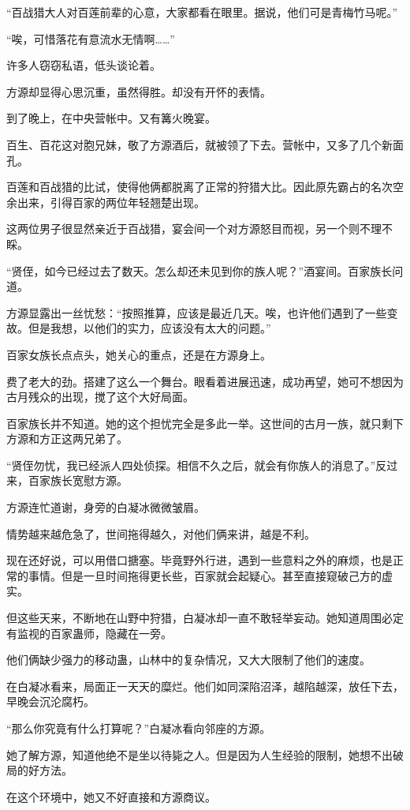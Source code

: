 \begin{this_body}
“百战猎大人对百莲前辈的心意，大家都看在眼里。据说，他们可是青梅竹马呢。”

“唉，可惜落花有意流水无情啊……”

许多人窃窃私语，低头谈论着。

方源却显得心思沉重，虽然得胜。却没有开怀的表情。

到了晚上，在中央营帐中。又有篝火晚宴。

百生、百花这对胞兄妹，敬了方源酒后，就被领了下去。营帐中，又多了几个新面孔。

百莲和百战猎的比试，使得他俩都脱离了正常的狩猎大比。因此原先霸占的名次空余出来，引得百家的两位年轻翘楚出现。

这两位男子很显然亲近于百战猎，宴会间一个对方源怒目而视，另一个则不理不睬。

“贤侄，如今已经过去了数天。怎么却还未见到你的族人呢？”酒宴间。百家族长问道。

方源显露出一丝忧愁：“按照推算，应该是最近几天。唉，也许他们遇到了一些变故。但是我想，以他们的实力，应该没有太大的问题。”

百家女族长点点头，她关心的重点，还是在方源身上。

费了老大的劲。搭建了这么一个舞台。眼看着进展迅速，成功再望，她可不想因为古月残众的出现，搅了这个大好局面。

百家族长并不知道。她的这个担忧完全是多此一举。这世间的古月一族，就只剩下方源和方正这两兄弟了。

“贤侄勿忧，我已经派人四处侦探。相信不久之后，就会有你族人的消息了。”反过来，百家族长宽慰方源。

方源连忙道谢，身旁的白凝冰微微皱眉。

情势越来越危急了，世间拖得越久，对他们俩来讲，越是不利。

现在还好说，可以用借口搪塞。毕竟野外行进，遇到一些意料之外的麻烦，也是正常的事情。但是一旦时间拖得更长些，百家就会起疑心。甚至直接窥破己方的虚实。

但这些天来，不断地在山野中狩猎，白凝冰却一直不敢轻举妄动。她知道周围必定有监视的百家蛊师，隐藏在一旁。

他们俩缺少强力的移动蛊，山林中的复杂情况，又大大限制了他们的速度。

在白凝冰看来，局面正一天天的糜烂。他们如同深陷沼泽，越陷越深，放任下去，早晚会沉沦腐朽。

“那么你究竟有什么打算呢？”白凝冰看向邻座的方源。

她了解方源，知道他绝不是坐以待毙之人。但是因为人生经验的限制，她想不出破局的好方法。

在这个环境中，她又不好直接和方源商议。


\end{this_body}
